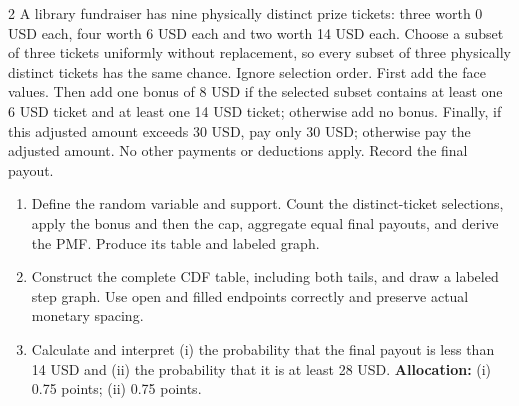 \begin{multicols*}{2}
A library fundraiser has nine physically distinct prize tickets: three worth 0 USD each, four worth 6 USD each and two worth 14 USD each. Choose a subset of three tickets uniformly without replacement, so every subset of three physically distinct tickets has the same chance. Ignore selection order. First add the face values. Then add one bonus of 8 USD if the selected subset contains at least one 6 USD ticket and at least one 14 USD ticket; otherwise add no bonus. Finally, if this adjusted amount exceeds 30 USD, pay only 30 USD; otherwise pay the adjusted amount. No other payments or deductions apply. Record the final payout.

\begin{enumerate}[label=(\alph*)]
\item Define the random variable and support. Count the distinct-ticket selections, apply the bonus and then the cap, aggregate equal final payouts, and derive the PMF. Produce its table and labeled graph. 
\item Construct the complete CDF table, including both tails, and draw a labeled step graph. Use open and filled endpoints correctly and preserve actual monetary spacing. 
\item Calculate and interpret (i) the probability that the final payout is less than 14 USD and (ii) the probability that it is at least 28 USD. 
\textbf{Allocation:} (i) 0.75 points; (ii) 0.75 points.
\end{enumerate}
\end{multicols*}

